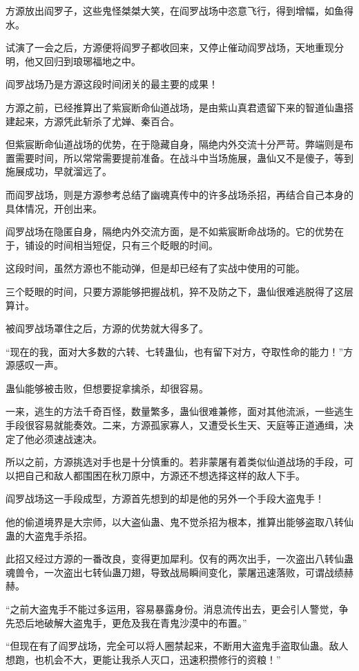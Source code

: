 \begin{this_body}
方源放出阎罗子，这些鬼怪桀桀大笑，在阎罗战场中恣意飞行，得到增幅，如鱼得水。

试演了一会之后，方源便将阎罗子都收回来，又停止催动阎罗战场，天地重现分明，他又回归到琅琊福地之中。

阎罗战场乃是方源这段时间闭关的最主要的成果！

方源之前，已经推算出了紫宸断命仙道战场，是由紫山真君遗留下来的智道仙蛊搭建起来，方源凭此斩杀了尤婵、秦百合。

但紫宸断命仙道战场的优势，在于隐藏自身，隔绝内外交流十分严苛。弊端则是布置需要时间，所以常常需要提前准备。在战斗中当场施展，蛊仙又不是傻子，等到施展成功，早就溜远了。

而阎罗战场，则是方源参考总结了幽魂真传中的许多战场杀招，再结合自己本身的具体情况，开创出来。

阎罗战场在隐匿自身，隔绝内外交流方面，是不如紫宸断命战场的。它的优势在于，铺设的时间相当短促，只有三个眨眼的时间。

这段时间，虽然方源也不能动弹，但是却已经有了实战中使用的可能。

三个眨眼的时间，只要方源能够把握战机，猝不及防之下，蛊仙很难逃脱得了这层算计。

被阎罗战场罩住之后，方源的优势就大得多了。

“现在的我，面对大多数的六转、七转蛊仙，也有留下对方，夺取性命的能力！”方源感叹一声。

蛊仙能够被击败，但想要捉拿擒杀，却很容易。

一来，逃生的方法千奇百怪，数量繁多，蛊仙很难兼修，面对其他流派，一些逃生手段很容易就能奏效。二来，方源孤家寡人，又遭受长生天、天庭等正道通缉，决定了他必须速战速决。

所以之前，方源挑选对手也是十分慎重的。若非蒙屠有着类似仙道战场的手段，可以把自己和敌人都围困在秋刀原中，方源还不想选择这样的敌人下手。

阎罗战场这一手段成型，方源首先想到的却是他的另外一个手段大盗鬼手！

他的偷道境界是大宗师，以大盗仙蛊、鬼不觉杀招为根本，推算出能够盗取八转仙蛊的大盗鬼手杀招。

此招又经过方源的一番改良，变得更加犀利。仅有的两次出手，一次盗出八转仙蛊魂兽令，一次盗出七转仙蛊刀翅，导致战局瞬间变化，蒙屠迅速落败，可谓战绩赫赫。

“之前大盗鬼手不能过多运用，容易暴露身份。消息流传出去，更会引人警觉，争先恐后地破解大盗鬼手，更危及我在青鬼沙漠中的布置。”

“但现在有了阎罗战场，完全可以将人圈禁起来，不断用大盗鬼手盗取仙蛊。敌人想跑，也机会不大，更能让我杀人灭口，迅速积攒修行的资粮！”


\end{this_body}
